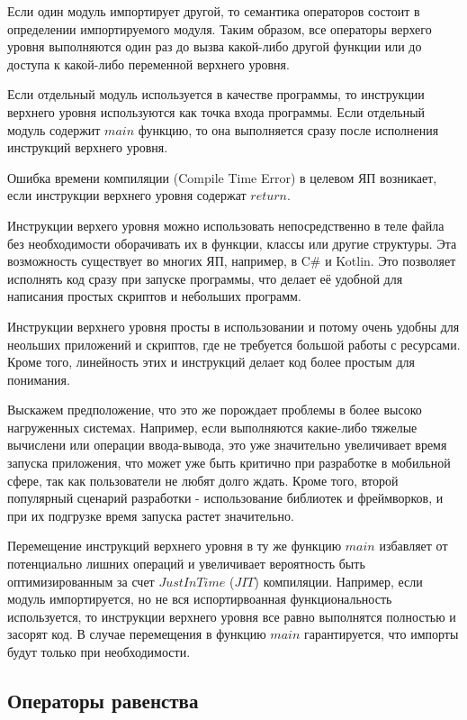 \documentclass{mipt-thesis-bs}
\begin{document}
Если один модуль импортирует другой, то семантика операторов
состоит в определении импортируемого модуля.
Таким образом, все операторы верхего уровня выполняются один раз до
вызва какой-либо другой функции или до доступа к какой-либо
переменной верхнего уровня.

Если отдельный модуль используется в качестве программы, то инструкции
верхнего уровня используются как точка входа программы. Если отдельный
модуль содержит $main$ функцию, то она выполняется сразу после
исполнения инструкций верхнего уровня.

Ошибка времени компиляции (Compile Time Error) в целевом ЯП возникает, если
инструкции верхнего уровня содержат $return$.

Инструкции верхего уровня можно использовать
непосредственно в теле файла без необходимости оборачивать их в функции,
классы или другие структуры. Эта возможность существует во многих ЯП, например,
в C\# и Kotlin. Это позволяет исполнять код сразу при запуске программы, что делает её
удобной для написания простых скриптов и небольших программ.

Инструкции верхнего уровня просты в использовании и потому очень удобны
для неольших приложений и скриптов, где не требуется большой работы
с ресурсами. Кроме того, линейность этих и инструкций делает код
более простым для понимания.

Выскажем предположение, что это же порождает проблемы в более
высоко нагруженных системах. Например, если выполняются какие-либо
тяжелые вычислени или операции ввода-вывода, это уже значительно
увеличивает время запуска приложения, что может уже быть критично
при разработке в мобильной сфере, так как пользователи не любят
долго ждать. Кроме того, второй популярный сценарий разработки -
использование библиотек и фреймворков, и при их подгрузке время
запуска растет значительно.

Перемещение инструкций верхнего уровня
в ту же функцию $main$ избавляет от потенциально лишних операций
и увеличивает вероятность быть оптимизированным за счет $Just In Time$
($JIT$) компиляции.
Например, если модуль импортируется, но не вся испортирвоанная
функциональность используется, то инструкции верхнего уровня все
равно выполнятся полностью и засорят код. В случае перемещения в
функцию $main$ гарантируется, что импорты будут  только
при необходимости.

\subsection{Операторы равенства}
\end{document}
